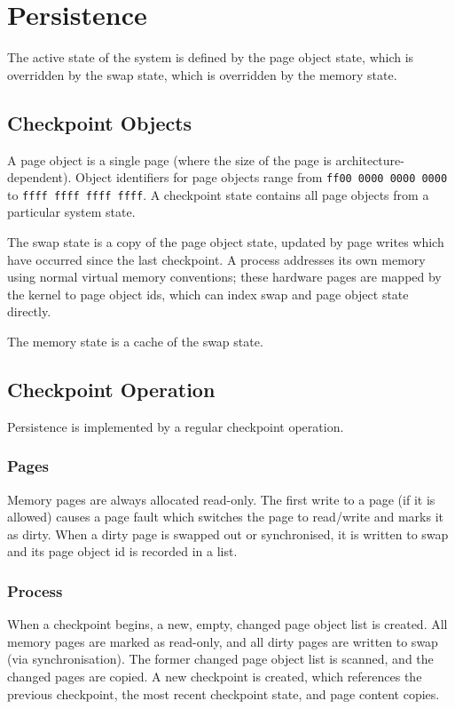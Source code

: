 \chapter{Persistence}

The active state of the system is defined by the page object state, which is overridden by the swap state, which is overridden by the memory state.

\section{Checkpoint Objects}

A page object is a single page (where the size of the page is architecture-dependent).  Object identifiers for page objects range from {\tt ff00 0000 0000 0000} to {\tt ffff ffff ffff ffff}.  A checkpoint state contains all page objects from a particular system state.

The swap state is a copy of the page object state, updated by page writes which have occurred since the last checkpoint.  A process addresses its own memory using normal virtual memory conventions; these hardware pages are mapped by the kernel to page object ids, which can index swap and page object state directly.

The memory state is a cache of the swap state.

\section{Checkpoint Operation}

Persistence is implemented by a regular checkpoint operation.

\subsection{Pages}

Memory pages are always allocated read-only.  The first write to a page (if it is allowed) causes a page fault which switches the page to read/write and marks it as dirty.  When a dirty page is swapped out or synchronised, it is written to swap and its page object id is recorded in a list.

\subsection{Process}

When a checkpoint begins, a new, empty, changed page object list is created.  All memory pages are marked as read-only, and all dirty pages are written to swap (via synchronisation).  The former changed page object list is scanned, and the changed pages are copied.  A new checkpoint is created, which references the previous checkpoint, the most recent checkpoint state, and page content copies.

